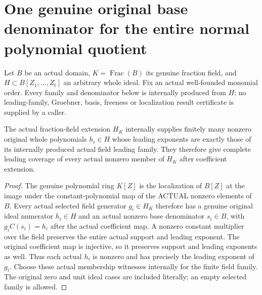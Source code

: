\section{One genuine original base denominator for the entire normal polynomial quotient}
Let $B$ be an actual domain, $K=\operatorname{Frac}(B)$ its genuine fraction
field, and $H\subset B[Z_1,\ldots,Z_t]$ an arbitrary whole ideal. Fix an actual
well-founded monomial order. Every family and denominator below is internally
produced from $H$; no leading-family, Groebner, basis, freeness or localization
result certificate is supplied by a caller.

\begin{theorem}
\label{hir:relative-normal-uniform-original-leading-lifts}
\leanok
{}
The actual fraction-field extension $H_K$ internally supplies finitely many
nonzero original whole polynomials $h_i\in H$ whose leading exponents are
exactly those of its internally produced actual field leading family. They
therefore give complete leading coverage of every actual nonzero member of
$H_K$ after coefficient extension.
\end{theorem}
\begin{proof}
The genuine polynomial ring $K[Z]$ is the localization of $B[Z]$ at the image
under the constant-polynomial map of the ACTUAL nonzero elements of $B$.
Every actual selected field generator $g_i\in H_K$ therefore has a genuine
original ideal numerator $h_i\in H$ and an actual nonzero base denominator
$s_i\in B$, with $g_i C(s_i)=h_i$ after the actual coefficient map. A nonzero
constant multiplier over the field preserves the entire actual support and
leading exponent. The original coefficient map is injective, so it preserves
support and leading exponents as well. Thus each actual $h_i$ is nonzero and
has precisely the leading exponent of $g_i$. Choose these actual membership
witnesses internally for the finite field family. The original zero and unit
ideal cases are included literally; an empty selected family is allowed.
\end{proof}

